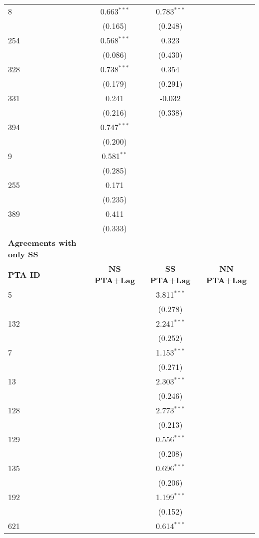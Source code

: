 \begin{longtable}{lccc}
    8 & 0.663$^{\ast\ast\ast}$ & 0.783$^{\ast\ast\ast}$ &  \\
    & (0.165) & (0.248) &  \\
    254 & 0.568$^{\ast\ast\ast}$ & 0.323 &  \\
    & (0.086) & (0.430) &  \\
    328 & 0.738$^{\ast\ast\ast}$ & 0.354 &  \\
    & (0.179) & (0.291) &  \\
    331 & 0.241 & -0.032 &  \\
    & (0.216) & (0.338) &  \\
    394 & 0.747$^{\ast\ast\ast}$ &  &  \\
    & (0.200) &  &  \\
    9 & 0.581$^{\ast\ast}$ &  &  \\
    & (0.285) &  &  \\
    255 & 0.171 &  &  \\
    & (0.235) &  &  \\
    389 & 0.411 &  &  \\
    & (0.333) &  &  \\
    \hline
    \textbf{Agreements with only SS} &  &  &  \\
    \hline
    \textbf{PTA ID} & \textbf{NS PTA+Lag} & \textbf{SS PTA+Lag} & \textbf{NN PTA+Lag} \\
    \hline
    5   &  & 3.811$^{\ast\ast\ast}$ &  \\
    &  & (0.278) &  \\
    132 &  & 2.241$^{\ast\ast\ast}$ &  \\
    &  & (0.252) &  \\
    7   &  & 1.153$^{\ast\ast\ast}$ &  \\
    &  & (0.271) &  \\
    13  &  & 2.303$^{\ast\ast\ast}$ &  \\
    &  & (0.246) &  \\
    128 &  & 2.773$^{\ast\ast\ast}$ &  \\
    &  & (0.213) &  \\
    129 &  & 0.556$^{\ast\ast\ast}$ &  \\
    &  & (0.208) &  \\
    135 &  & 0.696$^{\ast\ast\ast}$ &  \\
    &  & (0.206) &  \\
    192 &  & 1.199$^{\ast\ast\ast}$ &  \\
    &  & (0.152) &  \\
    621 &  & 0.614$^{\ast\ast\ast}$ &  \\

\end{longtable}
